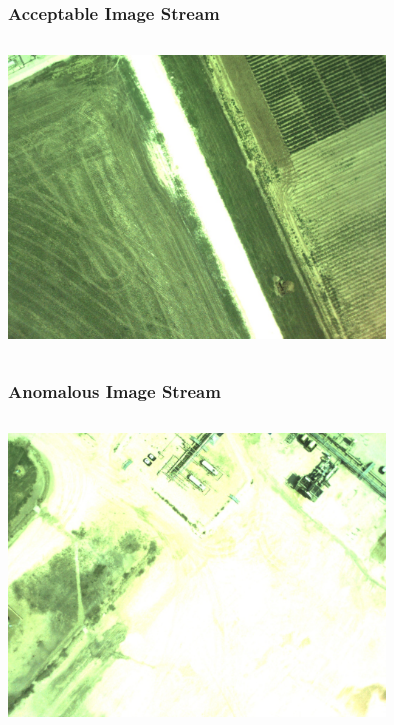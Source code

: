 \documentclass{beamer}
\begin{document}
\begin{frame}
\frametitle{Acceptable Image Stream}
\begin{columns}
\begin{centering}
\includegraphics[width = 10cm]{Figures/good5}
\end{centering}
\end{columns}
\end{frame}


\begin{frame}
\frametitle{Anomalous Image Stream}
\begin{columns}
\begin{centering}
\includegraphics[width = 10cm]{Figures/bad1}
\end{centering}
\end{columns}
\end{frame}
\end{document}
